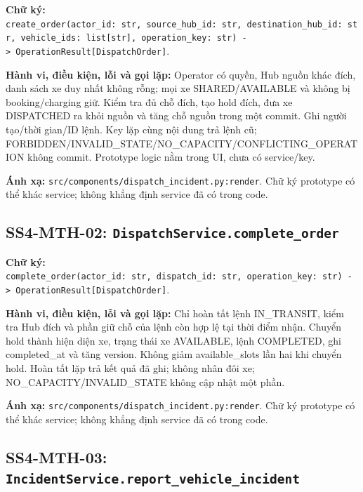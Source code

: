 \documentclass[11pt,a4paper]{article}
\begin{document}
\textbf{Chữ ký:}
\texttt{create\_order(actor\_id:\ str,\ source\_hub\_id:\ str,\ destination\_hub\_id:\ str,\ vehicle\_ids:\ list{[}str{]},\ operation\_key:\ str)\ -\textgreater{}\ OperationResult{[}DispatchOrder{]}}.

\textbf{Hành vi, điều kiện, lỗi và gọi lặp:} Operator có quyền, Hub
nguồn khác đích, danh sách xe duy nhất không rỗng; mọi xe
SHARED/AVAILABLE và không bị booking/charging giữ. Kiểm tra đủ chỗ đích,
tạo hold đích, đưa xe DISPATCHED ra khỏi nguồn và tăng chỗ nguồn trong
một commit. Ghi người tạo/thời gian/ID lệnh. Key lặp cùng nội dung trả
lệnh cũ; FORBIDDEN/INVALID\_STATE/NO\_CAPACITY/CONFLICTING\_OPERATION
không commit. Prototype logic nằm trong UI, chưa có service/key.

\textbf{Ánh xạ:} \texttt{src/components/dispatch\_incident.py:render}.
Chữ ký prototype có thể khác service; không khẳng định service đã có
trong code.

\hypertarget{ss4-mth-02-dispatchservice.complete_order}{%
\subsection{\texorpdfstring{SS4-MTH-02:
\texttt{DispatchService.complete\_order}}{SS4-MTH-02: DispatchService.complete\_order}}\label{ss4-mth-02-dispatchservice.complete_order}}

\textbf{Chữ ký:}
\texttt{complete\_order(actor\_id:\ str,\ dispatch\_id:\ str,\ operation\_key:\ str)\ -\textgreater{}\ OperationResult{[}DispatchOrder{]}}.

\textbf{Hành vi, điều kiện, lỗi và gọi lặp:} Chỉ hoàn tất lệnh
IN\_TRANSIT, kiểm tra Hub đích và phần giữ chỗ của lệnh còn hợp lệ tại
thời điểm nhận. Chuyển hold thành hiện diện xe, trạng thái xe AVAILABLE,
lệnh COMPLETED, ghi completed\_at và tăng version. Không giảm
available\_slots lần hai khi chuyển hold. Hoàn tất lặp trả kết quả đã
ghi; không nhân đôi xe; NO\_CAPACITY/INVALID\_STATE không cập nhật một
phần.

\textbf{Ánh xạ:} \texttt{src/components/dispatch\_incident.py:render}.
Chữ ký prototype có thể khác service; không khẳng định service đã có
trong code.

\hypertarget{ss4-mth-03-incidentservice.report_vehicle_incident}{%
\subsection{\texorpdfstring{SS4-MTH-03:
\texttt{IncidentService.report\_vehicle\_incident}}{SS4-MTH-03: IncidentService.report\_vehicle\_incident}}\label{ss4-mth-03-incidentservice.report_vehicle_incident}}
\end{document}
